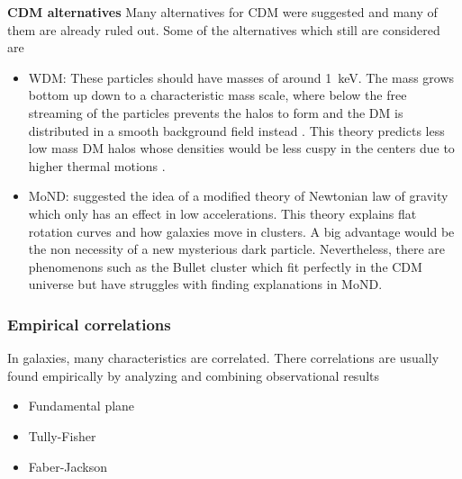 \textbf{\ac{CDM} alternatives} Many alternatives for \ac{CDM} were suggested and many of them are already ruled out. Some of the alternatives which still are considered are 
\begin{itemize}
    \item \ac{WDM}: These particles should have masses of around \SI{1}{keV}. The mass grows bottom up down to a characteristic mass scale, where below the free streaming of the particles prevents the halos to form and the \ac{DM} is distributed in a smooth background field instead \citep{Smith...WDM..2011, Schneider...WDM...2013}. This theory predicts less low mass \ac{DM} halos whose densities would be less cuspy in the centers due to higher thermal motions \citep{Bode...WDM...2001}.
    \item \ac{MoND}: \cite{Milgrom...MoND...1983} suggested the idea of a modified theory of Newtonian law of gravity which only has an effect in low accelerations. This theory explains flat rotation curves and how galaxies move in clusters. A big advantage would be the non necessity of a new mysterious dark particle. Nevertheless, there are phenomenons such as the Bullet cluster \citep{Clowe...Bullett...2006} which fit perfectly in the \ac{CDM} universe but have struggles with finding explanations in \ac{MoND}.
\end{itemize}

\subsubsection{Empirical correlations}
In galaxies, many characteristics are correlated. There correlations are usually found empirically by analyzing and combining observational results
\begin{itemize}
    \item Fundamental plane
    \item Tully-Fisher
    \item Faber-Jackson
\end{itemize}

\iffalse
\subsubsection{Application}
MW \acp{GC} proper motions and dynamics (including action distribution and dynamical model of potentials): \cite{Vasiliev...GCdynsGaiaDR2...2018}\\
Modelling the \ac{MW}'s \ac{GC} system: \cite{Binney...GCsystem...2017}
\fi

